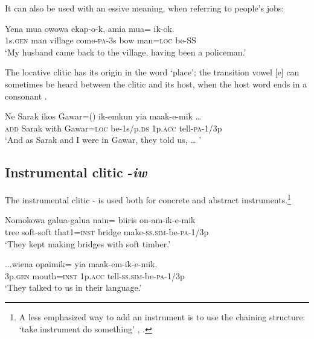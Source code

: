 It can also be used with an essive meaning, when referring to people's jobs:

\ea%
\label{ex:3:x765}
\gll Yena mua owowa ekap-o-k, amia mua= ik-ok. \\
1s.\textsc{gen} man village come-\textsc{pa}-3s bow man=\textsc{loc} be-SS \\
\glt`My husband came back to the village, having been a policeman.'
\z

The locative clitic has its origin in the word  `place'; the transition vowel [e] can sometimes be heard between the clitic and its host, when the host word ends in a consonant .

\ea%
\label{ex:3:x764}
\gll Ne Sarak ikos Gawar=() ik-emkun yia maak-e-mik {\dots} \\
\textsc{add} Sarak with Gawar=\textsc{loc} be-1s/p.\textsc{ds} 1p.\textsc{acc} tell-\textsc{pa}-1/3p\\
\glt`And as Sarak and I were in Gawar, they told us, {\dots} '
\z

\subsection{Instrumental clitic -\textit{iw}}\label{sec:3.12.5}
{}
The instrumental clitic -\textstyleStyleVernacularWordsItalic{} is used both for concrete  and abstract  instruments.\footnote{A less emphasized way to add an instrument is to use the chaining structure: `take instrument do something' , .} 

\ea%
\label{ex:3:x766}
\gll Nomokowa galua-galua nain= biiris on-am-ik-e-mik \\
tree soft-soft that1=\textsc{inst} bridge make-\textsc{ss}.\textsc{sim}-be-\textsc{pa}-1/3p\\
\glt`They kept making bridges with soft timber.'
\z

\ea%
\label{ex:3:x768}
\gll ...wiena opaimik= yia maak-em-ik-e-mik. \\
3p.\textsc{gen} mouth=\textsc{inst} 1p.\textsc{acc} tell-\textsc{ss}.\textsc{sim}-be-\textsc{pa}-1/3p\\
\glt`They talked to us in their language.'
\z


